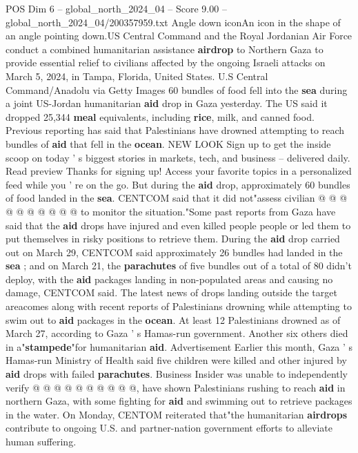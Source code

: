 \begin{textsample}{POS Dim 6 – global\_north\_2024\_04 – Score 9.00 – global\_north\_2024\_04/200357959.txt}  \label{ex:f6_pos_075}
Angle down iconAn icon in the shape of an angle pointing down.US Central Command and the Royal Jordanian Air Force conduct a combined humanitarian assistance \textbf{airdrop} to Northern Gaza to provide essential relief to civilians affected by the ongoing Israeli attacks on March 5, 2024, in Tampa, Florida, United States.
U.S Central Command/Anadolu via Getty Images 60 bundles of food fell into the \textbf{sea} during a joint US-Jordan humanitarian \textbf{aid} drop in Gaza yesterday.
The US said it dropped 25,344 \textbf{meal} equivalents, including \textbf{rice}, milk, and canned food.
Previous reporting has said that Palestinians have drowned attempting to reach bundles of \textbf{aid} that fell in the \textbf{ocean}.
NEW LOOK Sign up to get the inside scoop on today ' s biggest stories in markets, tech, and business -- delivered daily.
Read preview Thanks for signing up!
Access your favorite topics in a personalized feed while you ' re on the go.
But during the \textbf{aid} drop, approximately 60 bundles of food landed in the \textbf{sea}.
CENTCOM said that it did not"assess civilian @ @ @ @ @ @ @ @ @ @ to monitor the situation."Some past reports from Gaza have said that the \textbf{aid} drops have injured and even killed people people or led them to put themselves in risky positions to retrieve them.
During the \textbf{aid} drop carried out on March 29, CENTCOM said approximately 26 bundles had landed in the \textbf{sea} ; and on March 21, the \textbf{parachutes} of five bundles out of a total of 80 didn't deploy, with the \textbf{aid} packages landing in non-populated areas and causing no damage, CENTCOM said.
The latest news of drops landing outside the target areacomes along with recent reports of Palestinians drowning while attempting to swim out to \textbf{aid} packages in the \textbf{ocean}.
At least 12 Palestinians drowned as of March 27, according to Gaza ' s Hamas-run government.
Another six others died in a"\textbf{stampede}"for humanitarian \textbf{aid}.
Advertisement Earlier this month, Gaza ' s Hamas-run Ministry of Health said five children were killed and other injured by \textbf{aid} drops with failed \textbf{parachutes}.
Business Insider was unable to independently verify @ @ @ @ @ @ @ @ @ @, have shown Palestinians rushing to reach \textbf{aid} in northern Gaza, with some fighting for \textbf{aid} and swimming out to retrieve packages in the water.
On Monday, CENTOM reiterated that"the humanitarian \textbf{airdrops} contribute to ongoing U.S. and partner-nation government efforts to alleviate human suffering.

\end{textsample}
